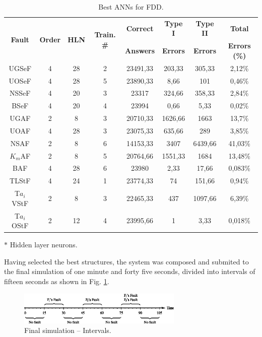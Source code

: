 \documentclass[10pt,fleqn,a4paper]{article}
\begin{document}
\begin{table}[htb]
\centering
\caption{Best ANNs for FDD.}
\label{tab:best_ann}
\begin{threeparttable}
\begin{tabular}{|c|c|c|c|c|c|c|c|}
\hline
\multirow{2}{*}{\bf Fault} &
\multirow{2}{*}{\bf Order} &
\multirow{2}{*}{{\bf HLN}\tnote{$*$}} &
\multirow{2}{*}{\bf Train. \#} &
{\bf Correct} & {\bf Type I} & {\bf Type II} & {\bf Total}\\
& & & & {\bf Answers} & {\bf Errors} & {\bf Errors} & {\bf Errors (\%)}\\
\hline
UGSeF & 4 & 28 & 2 & 23491,33 & 203,33 & 305,33 & 2,12\%\\
\hline
UOSeF & 4 & 28 & 5 & 23890,33 & 8,66 & 101 & 0,46\%\\
\hline
NSSeF & 4 & 20 & 3 & 23317 & 324,66 & 358,33 & 2,84\%\\
\hline
BSeF & 4 & 20 & 4 & 23994 & 0,66 & 5,33 & 0,02\%\\
\hline
UGAF & 2 & 8 & 3 & 20710,33 & 1626,66 & 1663 & 13,7\%\\
\hline
UOAF & 4 & 28 & 3 & 23075,33 & 635,66 & 289 & 3,85\%\\
\hline
{NSAF} & 2 & 8 & 6 & 14153,33 & 3407 & 6439,66 & 41,03\%\\
\hline
$K_m$AF & 2 & 8 & 5 & 20764,66 & 1551,33 & 1684 & 13,48\%\\
\hline
BAF & 4 & 28 & 6 & 23980 & 2,33 & 17,66 & 0,083\%\\
\hline
TLStF & 4 & 24 & 1 & 23774,33 & 74 & 151,66 & 0,94\%\\
\hline
T$a_i$VStF & 2 & 8 & 3 & 22465,33 & 437 & 1097,66 & 6,39\%\\
\hline
T$a_i$OStF & 2 & 12 & 4 & 23995,66 & 1 & 3,33 & 0,018\%\\
\hline
\end{tabular}
\begin{tablenotes}
\item [$*$] Hidden layer neurons.
\end{tablenotes}
\end{threeparttable}
\end{table}

Having selected the best structures, the system was composed and submited to the
final simulation of one minute and forty five seconds, divided into intervals of
fifteen seconds as shown in Fig. \ref{fig:intervals}.

\begin{figure}[htb]
\centering
    \includegraphics[width=0.7\textwidth]{imgs/intervals}
    \caption{Final simulation -- Intervals.}
    \label{fig:intervals}
\end{figure}
\end{document}
